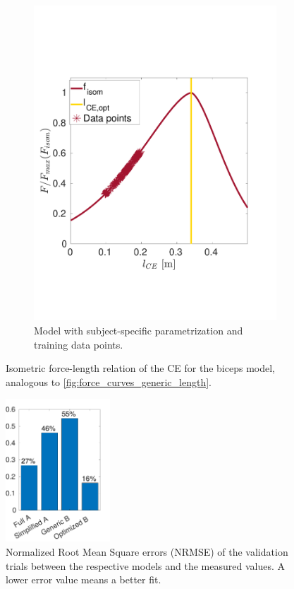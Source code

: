 \begin{figure}
\begin{subfigure}[t]{0.47\textwidth}
    \includegraphics[width=\textwidth]{images/summer_school_study/biceps_optimized.pdf}%
    \caption{Model with subject-specific parametrization and training data points.}%
    \label{fig:biceps_b}%
  \end{subfigure}%
  \caption{Isometric force-length relation of the CE for the biceps model, analogous to \cref{fig:force_curves_generic_length}.}%
  \label{fig:biceps_working_area}%
\end{figure}%


\begin{figure}%
  \centering%
  \includegraphics[width=0.35\textwidth]{images/summer_school_study/nrmse.pdf}%
  \caption{Normalized Root Mean Square errors (NRMSE) of the validation trials between the respective models and the measured values. A lower error value means a better fit.}%
  \label{fig:nrmse}%
\end{figure}%


